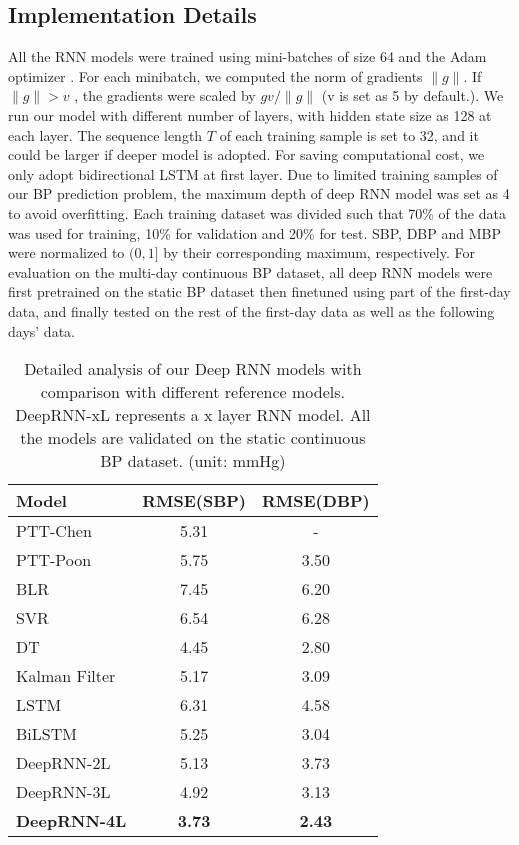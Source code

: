 \documentclass[letterpaper, 10 pt, conference]{ieeeconf}
\begin{document}
\subsection{Implementation Details}
All the RNN models were trained using mini-batches of size 64 and the Adam optimizer \cite{kingma2014adam}.
For each minibatch, we computed the norm of gradients $ \| g \| $. If  $ \| g \| > v$ , the gradients were scaled by  $ gv / \| g \| $ (v is set as 5 by default.).
We run our model with different number of layers, with hidden state size as 128 at each layer.
The sequence length $ T $ of each training sample is set to 32, and it could be larger if deeper model is adopted.
For saving computational cost, we only adopt bidirectional LSTM at first layer.
Due to limited training samples of our BP prediction problem, 
the maximum depth of deep RNN model was set as 4 to avoid overfitting.
Each training dataset was divided such that 70\% of the data was used for training, 10\% for validation and 20\% for test. 
SBP, DBP and MBP were normalized to $ (0,1] $ by their corresponding maximum, respectively.
For evaluation on the multi-day continuous BP dataset,
all deep RNN models were first pretrained on the static BP dataset then finetuned using part of the first-day data, and finally tested on the rest of the first-day data as well as the following days' data.
\begin{table} 
  \centering  
  \begin{tabularx}{0.7\linewidth}{lcc}
    \toprule
    {\textbf{Model}} & {\textbf{RMSE(SBP)}} & {\textbf{RMSE(DBP)}}  \\ \midrule    \midrule           
    PTT-Chen \cite{chen2000continuous}   	   & 5.31	    & -       \\
    PTT-Poon \cite{poon2006cuff}       &   5.75    &   3.50	   \\   
    \midrule
    BLR      	&  7.45	   	  	& 	6.20  	\\
    SVR  	& 	6.54   	  &  6.28 	 \\
    DT  		&  	4.45	  	&    2.80 	 \\  
    \midrule
    Kalman Filter 	& 5.17  	  	& 3.09   \\
    \midrule
    LSTM 	  &  6.31    	& 4.58 \\
    BiLSTM 	   &  5.25    	  	&  3.04  \\
    DeepRNN-2L   &  5.13	 		& 3.73  \\
    DeepRNN-3L    &  4.92	 	& 3.13 \\
    \textbf{DeepRNN-4L} 
       &  \textbf{3.73}  	& \textbf{2.43}	   \\
  \bottomrule 
  \end{tabularx} 
   \caption{Detailed analysis of our Deep RNN models with comparison with different reference models. DeepRNN-xL represents a x layer RNN model. All the models are validated on the static continuous BP dataset. (unit: mmHg)}
   \label{tab:1dayNEW}
\end{table}
\end{document}
